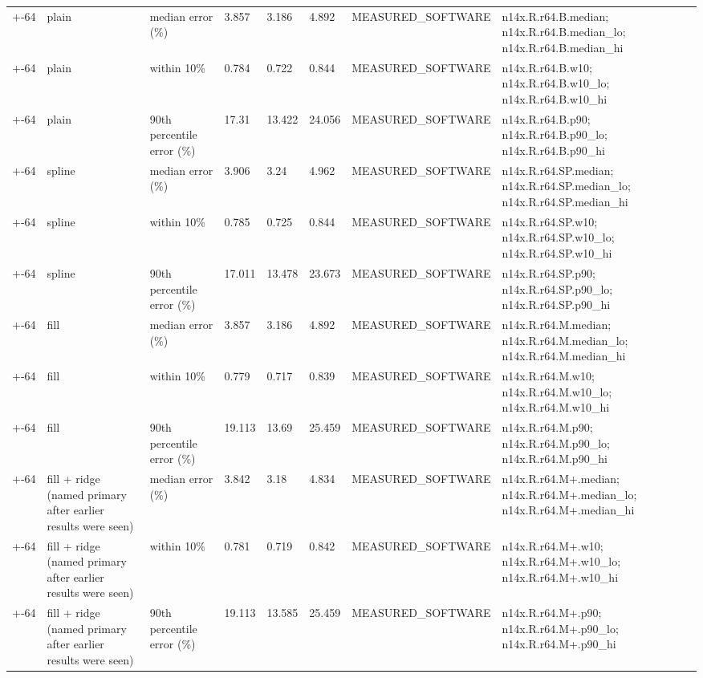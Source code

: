 \begin{table}[t]
\begin{tabular}{llllllll}
+-64 & plain & median error (\%) & 3.857 & 3.186 & 4.892 & MEASURED\_SOFTWARE & n14x.R.r64.B.median; n14x.R.r64.B.median\_lo; n14x.R.r64.B.median\_hi \\
+-64 & plain & within 10\% & 0.784 & 0.722 & 0.844 & MEASURED\_SOFTWARE & n14x.R.r64.B.w10; n14x.R.r64.B.w10\_lo; n14x.R.r64.B.w10\_hi \\
+-64 & plain & 90th percentile error (\%) & 17.31 & 13.422 & 24.056 & MEASURED\_SOFTWARE & n14x.R.r64.B.p90; n14x.R.r64.B.p90\_lo; n14x.R.r64.B.p90\_hi \\
+-64 & spline & median error (\%) & 3.906 & 3.24 & 4.962 & MEASURED\_SOFTWARE & n14x.R.r64.SP.median; n14x.R.r64.SP.median\_lo; n14x.R.r64.SP.median\_hi \\
+-64 & spline & within 10\% & 0.785 & 0.725 & 0.844 & MEASURED\_SOFTWARE & n14x.R.r64.SP.w10; n14x.R.r64.SP.w10\_lo; n14x.R.r64.SP.w10\_hi \\
+-64 & spline & 90th percentile error (\%) & 17.011 & 13.478 & 23.673 & MEASURED\_SOFTWARE & n14x.R.r64.SP.p90; n14x.R.r64.SP.p90\_lo; n14x.R.r64.SP.p90\_hi \\
+-64 & fill & median error (\%) & 3.857 & 3.186 & 4.892 & MEASURED\_SOFTWARE & n14x.R.r64.M.median; n14x.R.r64.M.median\_lo; n14x.R.r64.M.median\_hi \\
+-64 & fill & within 10\% & 0.779 & 0.717 & 0.839 & MEASURED\_SOFTWARE & n14x.R.r64.M.w10; n14x.R.r64.M.w10\_lo; n14x.R.r64.M.w10\_hi \\
+-64 & fill & 90th percentile error (\%) & 19.113 & 13.69 & 25.459 & MEASURED\_SOFTWARE & n14x.R.r64.M.p90; n14x.R.r64.M.p90\_lo; n14x.R.r64.M.p90\_hi \\
+-64 & fill + ridge (named primary after earlier results were seen) & median error (\%) & 3.842 & 3.18 & 4.834 & MEASURED\_SOFTWARE & n14x.R.r64.M+.median; n14x.R.r64.M+.median\_lo; n14x.R.r64.M+.median\_hi \\
+-64 & fill + ridge (named primary after earlier results were seen) & within 10\% & 0.781 & 0.719 & 0.842 & MEASURED\_SOFTWARE & n14x.R.r64.M+.w10; n14x.R.r64.M+.w10\_lo; n14x.R.r64.M+.w10\_hi \\
+-64 & fill + ridge (named primary after earlier results were seen) & 90th percentile error (\%) & 19.113 & 13.585 & 25.459 & MEASURED\_SOFTWARE & n14x.R.r64.M+.p90; n14x.R.r64.M+.p90\_lo; n14x.R.r64.M+.p90\_hi \\
\bottomrule
\end{tabular}
\end{table}
